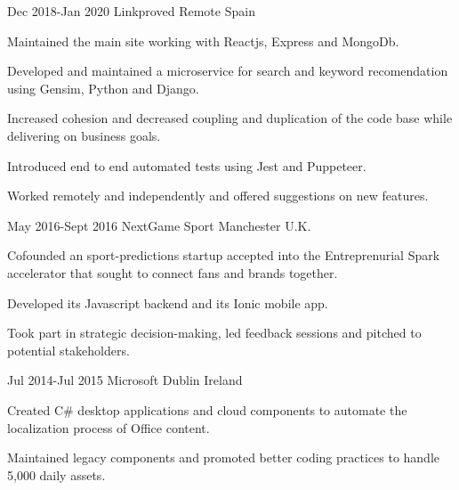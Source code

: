 \documentclass[10pt]{CurriculumVitae}
\begin{document}
      {Dec 2018-Jan 2020}
      {Linkproved}
      {Remote}
      {Spain}
      {
        \item Maintained the main site working with Reactjs, Express and MongoDb.
        \item Developed and maintained a microservice for search and keyword recomendation using Gensim, Python and Django.
        \item Increased cohesion and decreased coupling and duplication of the code base while delivering on business goals.
        \item Introduced end to end automated tests using Jest and Puppeteer.
        \item Worked remotely and independently and offered suggestions on new features.
      }
   
      {May 2016-Sept 2016}
      {NextGame Sport} 
      {Manchester}
      {U.K.}
      {
        \item Cofounded an sport-predictions startup accepted into the
          Entreprenurial Spark accelerator that sought to connect fans and brands together.
        \item Developed its Javascript backend and its Ionic mobile app.
        \item Took part in strategic decision-making, led feedback sessions and pitched to potential stakeholders.
      }
  
      {Jul 2014-Jul 2015}
      {Microsoft} 
      {Dublin}
      {Ireland}
      {
        \item Created C\# desktop applications and cloud components to automate the localization
        process of Office content.
        \item Maintained legacy components and promoted better coding practices to handle 5,000 daily assets.
      }
    
\end{document}
